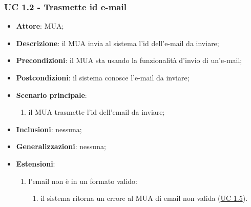     \subsubsection{UC 1.2 - Trasmette id e-mail} \label{sec:UC1.2}
    \begin{itemize}
        \item \textbf{Attore}: MUA;
        \item \textbf{Descrizione}: il MUA invia al sistema l'id dell'e-mail da inviare;
        \item \textbf{Precondizioni}: il MUA sta usando la funzionalità d'invio di un'e-mail;
        \item \textbf{Postcondizioni}: il sistema conosce l'e-mail da inviare;
        \item \textbf{Scenario principale}:
            \begin{enumerate}
                \item il MUA trasmette l'id dell'email da inviare;
            \end{enumerate}
        \item \textbf{Inclusioni}: nessuna;
        \item \textbf{Generalizzazioni}: nessuna;
        \item \textbf{Estensioni}:
            \begin{enumerate}[label=\alph*.]
                \item l'email non è in un formato valido:
                \begin{enumerate}[label=\arabic*.]
                    \item il sistema ritorna un errore al MUA di email non valida (\hyperref[sec:UC1.5]{UC 1.5}).
                \end{enumerate}
            \end{enumerate}
    \end{itemize}

